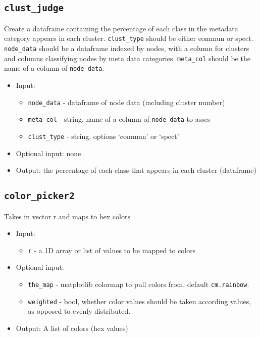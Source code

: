 \documentclass[10pt]{article}
\theoremstyle{definition}
\numberwithin{theorem}{section}
\numberwithin{definition}{section}
\numberwithin{lemma}{section}
\numberwithin{corollary}{section}
\numberwithin{clm}{section}
\numberwithin{rmk}{section}
\begin{document}
\cprotect \subsection{\verb|clust_judge|}
Create a dataframe containing the percentage of each class in the metadata category
appears in each cluster. \verb|clust_type| should be either commun or spect. \verb|node_data|
should be a dataframe indexed by nodes, with a column for clusters and columns
classifying nodes by meta data categories. \verb|meta_col| should be the name of a column of 
\verb|node_data|. 
\begin{itemize}
	\item Input: 
	\begin{itemize}
		\item \verb|node_data| - dataframe of node data (including cluster number)
		\item \verb|meta_col| - string, name of a column of \verb|node_data| to asses
		\item \verb|clust_type| - string, options `commun' or `spect'
	\end{itemize}
	\item Optional input: none
	\item Output: the percentage of each class that appears in each cluster (dataframe)
\end{itemize}

\cprotect \subsection{\verb|color_picker2|}
Takes in vector r and maps to hex colors
\begin{itemize}
	\item Input: 
	\begin{itemize}
		\item \verb|r| - a 1D array or list of values to be mapped to colors
	\end{itemize}
	\item Optional input:
	\begin{itemize}
		\item \verb|the_map| - matplotlib colormap to pull colors from, default \verb|cm.rainbow|.
		\item \verb|weighted| - bool, whether color values should be taken according values, as opposed to evenly distributed.
	\end{itemize}
	\item Output: A list of colors (hex values)
\end{itemize}
\end{document}
